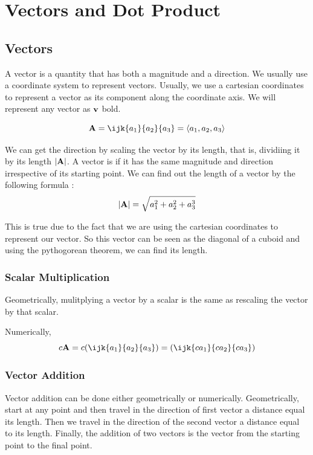 

\chapter{Vectors and Dot Product}  

\bigbreak
\section{Vectors}

A vector is a quantity that has both a magnitude and a direction.
We usually use a coordinate system to represent vectors.
Usually, we use a cartesian coordinates to represent a vector as its component along the coordinate axis.
We will represent any vector as ${\bf v}$ bold.

$$ {\bf A} = \ijk{a_1}{a_2}{a_3} = \left< a_1, a_2, a_3 \right> $$ 

We can get the direction by scaling the vector by its length, that is, dividiing it by its length $|{\bf A}|$.
A vector is if it has the same magnitude and direction irrespective of its starting point.
We can find out the length of a vector by the following formula : $$ |{\bf A}| = \sqrt{a_1^2 + a_2^2 + a_3^3} $$

This is true due to the fact that we are using the cartesian coordinates to represent our vector. 
So this vector can be seen as the diagonal of a cuboid and using the pythogorean theorem, we can find its length.

\subsection{Scalar Multiplication}
Geometrically, mulitplying a vector by a scalar is the same as rescaling the vector by that scalar.

Numerically, $$ c {\bf A} = c (\ijk{a_1}{a_2}{a_3}) = (\ijk{ca_1}{ca_2}{ca_3}) $$

\subsection{Vector Addition}

Vector addition can be done either geometrically or numerically. 
Geometrically, start at any point and then travel in the direction of first vector a distance equal its length.
Then we travel in the direction of the second vector a distance equal to its length.
Finally, the addition of two vectors is the vector from the starting point to the final point.

